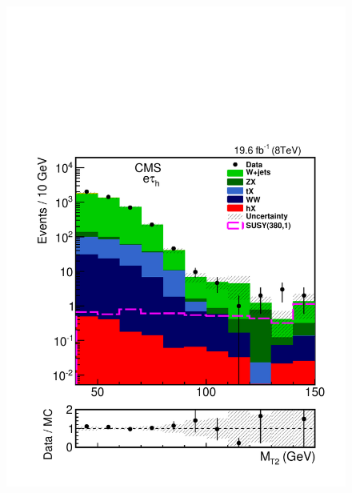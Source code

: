 \begin{figure}[!htb]
\centering
\includegraphics[angle=0,scale=0.375]{SelectionEleTau/MT2_eletau.pdf}

\end{figure}
